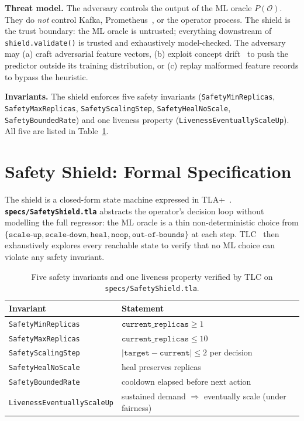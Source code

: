 \documentclass[conference,10pt]{IEEEtran}
\begin{document}
\textbf{Threat model.} The adversary controls the output of the ML
oracle $P(\mathcal{O})$. They do \emph{not} control Kafka,
Prometheus~\cite{prometheus_doc}, or the operator process. The shield
is the trust boundary: the ML oracle is untrusted; everything downstream
of \texttt{shield.validate()} is trusted and exhaustively model-checked.
The adversary may (a) craft adversarial feature vectors, (b) exploit
concept drift~\cite{webb_concept_drift_2016} to push the predictor outside its
training distribution, or (c) replay malformed feature records to
bypass the heuristic.

\textbf{Invariants.} The shield enforces five safety invariants
(\texttt{SafetyMinReplicas}, \texttt{SafetyMaxReplicas},
\texttt{SafetyScalingStep}, \texttt{SafetyHealNoScale},
\texttt{SafetyBoundedRate}) and one liveness property
(\texttt{LivenessEventuallyScaleUp}). All five are listed in
Table~\ref{tab:invariants}.

\section{Safety Shield: Formal Specification}
\label{sec:shield}

The shield is a closed-form state machine expressed in
TLA+~\cite{lamport_tla_1994}. \textbf{\texttt{specs/SafetyShield.tla}}
abstracts the operator's decision loop without modelling the full
regressor: the ML oracle is a thin non-deterministic choice from
$\{\texttt{scale-up}, \texttt{scale-down}, \texttt{heal}, \texttt{noop},
\texttt{out-of-bounds}\}$ at each step. TLC~\cite{tlc_doc} then
exhaustively explores every reachable state to verify that no ML
choice can violate any safety invariant.

\begin{table}[!t]
  \centering
  \caption{Five safety invariants and one liveness property verified by TLC on \texttt{specs/SafetyShield.tla}.}
  \label{tab:invariants}
  \begin{tabular}{ll}
    \toprule
    \textbf{Invariant}                   & \textbf{Statement}                                                \\
    \midrule
    \texttt{SafetyMinReplicas}           & $\texttt{current\_replicas} \geq 1$                              \\
    \texttt{SafetyMaxReplicas}           & $\texttt{current\_replicas} \leq 10$                             \\
    \texttt{SafetyScalingStep}           & $|\texttt{target}-\texttt{current}| \leq 2$ per decision          \\
    \texttt{SafetyHealNoScale}           & heal preserves replicas                                            \\
    \texttt{SafetyBoundedRate}           & cooldown elapsed before next action                               \\
    \midrule
    \texttt{LivenessEventuallyScaleUp}   & sustained demand $\Rightarrow$ eventually scale (under fairness) \\
    \bottomrule
  \end{tabular}
\end{table}
\end{document}
